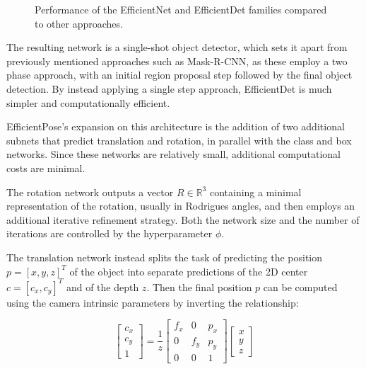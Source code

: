 \begin{figure}[htp]
    

    \caption{Performance of the EfficientNet and EfficientDet families compared to other approaches.}
\end{figure}

The resulting network is a single-shot object detector, which sets it apart from previously mentioned approaches such as Mask-R-CNN, as these employ a two phase approach, with an initial region proposal step followed by the final object detection. By instead applying a single step approach, EfficientDet is much simpler and computationally efficient.

EfficientPose's expansion on this architecture is the addition of two additional subnets that predict translation and rotation, in parallel with the class and box networks. Since these networks are relatively small, additional computational costs are minimal.

The rotation network outputs a vector $R \in \mathbb{R}^3$ containing a minimal representation of the rotation, usually in Rodrigues angles, and then employs an additional iterative refinement strategy. Both the network size and the number of iterations are controlled by the hyperparameter $\phi$.

The translation network instead splits the task of predicting the position $p=[x, y, z]^T$ of the object into separate predictions of the 2D center $c = [c_x, c_y]^T$ and of the depth $z$. Then the final position $p$ can be computed using the camera intrinsic parameters by inverting the relationship:

\begin{equation}
    \begin{bmatrix}
        c_x\\c_y\\1
    \end{bmatrix}
    = \frac{1}{z}
    \begin{bmatrix}
        f_x & 0 & p_x \\
        0 & f_y & p_y \\
        0 & 0 & 1 
    \end{bmatrix}
    \begin{bmatrix}
        x\\y\\z
    \end{bmatrix}
\end{equation}

